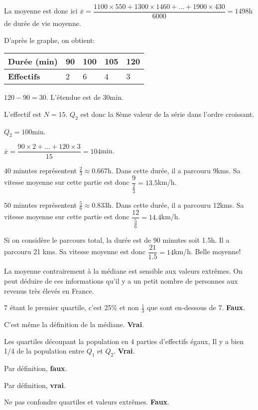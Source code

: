 \documentclass[a4paper,12pt]{scrartcl}
\begin{document}
La moyenne est donc ici $\overline{x} = \dfrac{1100 \times 550 + 1300 \times 1460 + \ldots + 1900 \times 430}{6000} = 1498$h de durée de vie moyenne.


\exo{}

\partie{}

\question{}
D'après le graphe, on obtient:

\begin{center}
\begin{tabular}{|l|l|l|l|l|}
\hline
\textbf{Durée (min)} & 90 & 100 & 105 & 120\\
\hline
\textbf{Effectifs} & 2 & 6 & 4 & 3\\
\hline
\end{tabular}
\end{center}



$120-90 = 30$. L'étendue est de 30min.


L'effectif est $N = 15$. $Q_2$ est donc la 8ème valeur de la série dans l'ordre croissant. 

$Q_2 = 100$min.

\subquestion{}

$\overline{x} = \dfrac{90 \times 2 + \ldots + 120 \times 3}{15} = 104$min.


\question{}
$40$ minutes représentent $\frac{2}{3} \approx 0.667$h. Dans cette durée, il a parcouru 9kms. Sa vitesse moyenne sur cette partie est donc $\dfrac{9}{\frac{2}{3}} = 13.5$km/h.

\question{}
$50$ minutes représentent $\frac{5}{6} \approx 0.833$h. Dans cette durée, il a parcouru 12kms. Sa vitesse moyenne sur cette partie est donc $\dfrac{12}{\frac{5}{6}} = 14.4$km/h.

\question{}
Si on considère le parcours total, la durée est de 90 minutes soit 1.5h. Il a parcouru 21 kms. Sa vitesse moyenne est donc $\dfrac{21}{1.5} = 14$km/h. Belle moyenne!


La moyenne contrairement à la médiane est sensible aux valeurs extrêmes. On peut déduire de ces informations qu'il y a un petit nombre de personnes aux revenus très élevés en France.


\question{}
7 étant le premier quartile, c'est 25\% et non $\frac{1}{3}$ que sont en-dessous de 7. \textbf{Faux}.

\question{}
C'est même la définition de la médiane. \textbf{Vrai}.

\question{}
Les quartiles découpant la population en 4 parties d'effectifs égaux, Il y a bien 1/4 de la population entre $Q_1$ et $Q_2$. \textbf{Vrai}.

\question{}
Par définition, \textbf{faux}.

\question{}
Par définition, \textbf{vrai}.

\question{}
Ne pas confondre quartiles et valeurs extrêmes. \textbf{Faux}.

\trait
\end{document}

